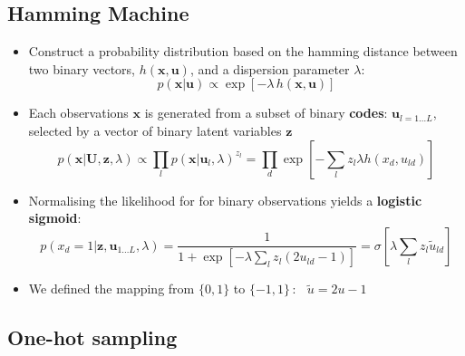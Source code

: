 \documentclass[11pt]{article}
\begin{document}
\subsection*{Hamming Machine}
\label{sec-5-2}
\begin{itemize}
\item Construct a probability distribution based on the hamming distance between two binary vectors, ${h(\mathbf{x},\mathbf{u})}$, and a dispersion parameter ${\lambda}$: $$ p(\mathbf{x}|\mathbf{u}) \propto \exp\left[ -\lambda \, h(\mathbf{x},\mathbf{u}) \right] $$
\item Each observations ${\mathbf{x} }$ is generated from a subset of binary \textbf{codes}: ${\mathbf{u}_{l{=}1\ldots L}}$, selected by a vector of binary latent variables ${\mathbf{z}}$ $$ p(\mathbf{x}|\mathbf{U},\mathbf{z},\lambda) \propto \prod\limits_l p(\mathbf{x}|\mathbf{u}_l,\lambda)^{z_l} = \prod\limits_d \exp\left[- \sum_l z_l \lambda h(x_d,u_{ld}) \right]$$
\item Normalising the likelihood for for binary observations yields a \textbf{logistic sigmoid}: $$ p(x_d = 1|\mathbf{z}, \mathbf{u}_{1\ldots L}, \lambda) = \frac{1}{1+\exp\left[-\lambda \sum\limits_l z_l (2u_{ld} - 1) \right]} = \sigma\left[\lambda \sum_l z_l \tilde{u}_{ld} \right]$$
\item We defined the mapping from ${\{0,1\}}$ to ${\{{-}1,1\}\,}$: $\;\;{\tilde{u} = 2u{-}1}$
\end{itemize}
\subsection*{One-hot sampling}
\label{sec-5-3}
\end{document}
